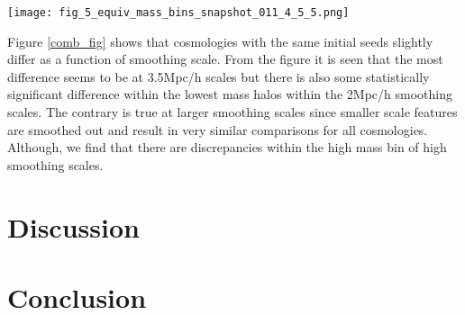 \documentclass[a4paper,fleqn,usenatbib]{mnras}
\begin{document}
\begin{figure*}
\centering
\texttt{[image: fig\_5\_equiv\_mass\_bins\_snapshot\_011\_4\_5\_5.png]}
\label{comb_fig} 
\caption{This figure shows overplotting of 3 cosmologies as in legend for 3 smoothing scales}
\end{figure*}

Figure \ref{comb_fig} shows that cosmologies with the same initial seeds slightly differ as a function of smoothing scale. From the figure it is seen that the most difference seems to be at 3.5Mpc/h scales but there is also some statistically significant difference within the lowest mass halos within the 2Mpc/h smoothing scales. The contrary is true at larger smoothing scales since smaller scale features are smoothed out and result in very similar comparisons for all cosmologies. Although, we find that there are discrepancies within the high mass bin of high smoothing scales.
\\



\section{Discussion}\label{discussion}



\section{Conclusion}\label{conclusion}


 

\bsp	%
\label{lastpage}
\end{document}
